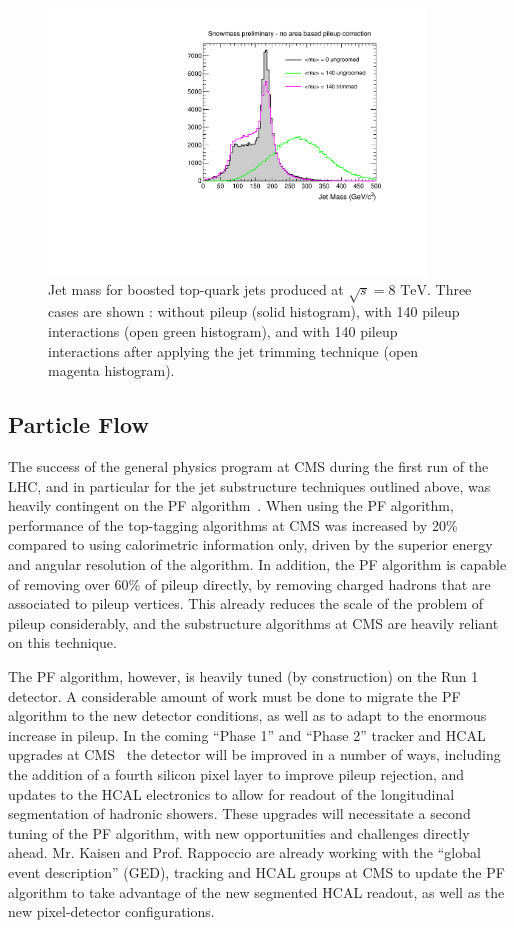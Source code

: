 \documentclass[12pt]{proposalnsf}
\newcommand{\TeV}{\ensuremath{\mathrm{TeV}}}
\begin{document}
\begin{figure}[h!]
    \centering
    \includegraphics[width=100mm]{jetmass_toptags_trimming}
    \caption{\label{jetmass_toptags_trimming} Jet mass for boosted
      top-quark jets produced at $\sqrt{s} = 8$ \TeV. Three cases are
      shown : without pileup (solid histogram), with 140 pileup
      interactions (open green histogram), and with 140 pileup
      interactions after applying the jet trimming technique (open
      magenta histogram).}
\end{figure}


\subsection{Particle Flow}
\label{sec:pf}

The success of the general physics program at CMS during
the first run of the LHC, and in particular for the jet substructure
techniques outlined above, was heavily contingent on the
PF algorithm~\cite{particleflow}. 
When using the PF algorithm, performance of the top-tagging
algorithms at CMS was increased by 20\% compared to using calorimetric
information only, driven by the superior energy
and angular resolution of the algorithm. In addition, the PF algorithm
is capable of removing
over 60\% of pileup directly, by removing charged hadrons that are
associated to pileup vertices. This already reduces the scale of the
problem of pileup considerably, and the substructure algorithms at CMS
are heavily reliant on this technique. 

The PF algorithm, however, is heavily tuned (by construction) on the
Run 1 detector. A considerable amount of work must be done to migrate
the PF algorithm to the new detector conditions, as well as to adapt
to the enormous increase in pileup.
In the coming ``Phase 1'' and ``Phase 2''
tracker and HCAL upgrades at CMS~\cite{Dominguez:1481838,Mans:1481837}
the detector will be improved in a number of ways, including the
addition of a fourth silicon pixel layer to improve pileup
rejection, and
updates to the HCAL electronics to allow for readout of the
longitudinal segmentation of hadronic showers. These upgrades will
necessitate a second tuning of the PF
algorithm, with new opportunities and challenges directly
ahead. Mr. Kaisen and Prof. Rappoccio are already working with the
``global event description'' (GED), tracking and HCAL groups at CMS to
update the PF algorithm to take advantage of the new segmented HCAL
readout, as well as the new pixel-detector configurations. 
\end{document}
